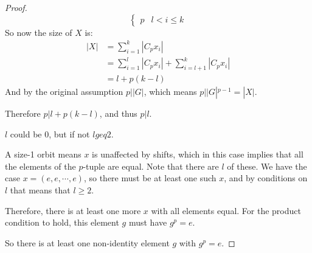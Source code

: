 \documentclass[../Main.tex]{subfiles}
\begin{document}
\begin{proof}
\begin{equation*}
\begin{cases}
            p & l < i \leq k
        \end{cases}
    \end{equation*}
    So now the size of $X$ is:
    \begin{align*}
        |X| &= \sum_{i=1}^{k} |C_p x_i| \\
        &= \sum_{i=1}^{l} |C_p x_i| + \sum_{i=l+1}^{k} |C_p x_i| \\
        &= l + p(k-l)
    \end{align*}
    And by the original assumption $p | |G|$, which means $p | |G|^{p-1} = |X|$.\par
    Therefore $p | l + p(k-l)$, and thus $p | l$.\par
    $l$ could be 0, but if not $l geq 2$.\par
    A size-1 orbit means $x$ is unaffected by shifts, which in this case implies that all the elements of the $p$-tuple are equal. Note that there are $l$ of these. We have the case $x = (e, e, \cdots, e)$, so there must be at least one such $x$, and by conditions on $l$ that means that $l \geq 2$.\par
    Therefore, there is at least one more $x$ with all elements equal. For the product condition to hold, this element $g$ must have $g^p = e$.\par
    So there is at least one non-identity element $g$ with $g^p = e$.
\end{proof}
\end{document}

